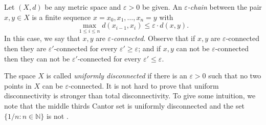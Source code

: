 Let \( (X,d) \) be any metric space and \( \varepsilon > 0 \) be given. An \emph{\( \varepsilon  \)-chain} between the pair \( x,y \in  X \) is a finite sequence \( x = x_0 , x_1, \hdots , x_{n} = y  \) with \[\max_{1 \leq i \leq n}  d(x_{i-1} , x_{i})  \leq \varepsilon \cdot d(x,y). \] In this case, we say that \( x, y \) are \emph{\( \varepsilon  \)-connected}. Observe that if \( x, y \) are \( \varepsilon  \)-connected then they are \( \varepsilon ' \)-connected for every \( \varepsilon ' \geq \varepsilon  \); and if \( x, y \) can not be \( \varepsilon  \)-connected then they can not be \( \varepsilon ' \)-connected for every \( \varepsilon ' \leq \varepsilon  \).


The space \( X \) is called \emph{uniformly disconnected} if there is an \( \varepsilon > 0 \) such that no two points in \( X \) can be \( \varepsilon  \)-connected. It is not hard to prove that uniform disconnectivity is stronger than total disconnectivity. To give some intuition, we note that the middle thirds Cantor set is uniformly disconnected and the set \( \{ 1/n : n \in \mathbb{N}  \}  \) is not \cite{metric:2001}.


